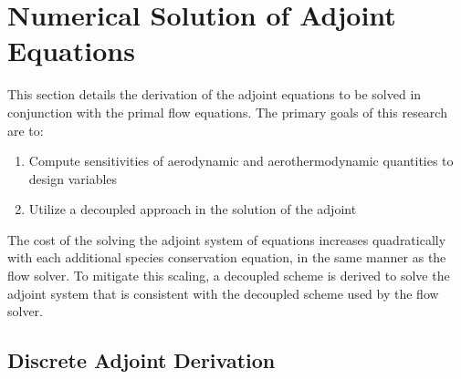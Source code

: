 \chapter{Numerical Solution of Adjoint Equations}
\label{chapter-four}

This section details the derivation of the adjoint equations to be solved in
conjunction with the primal flow equations.  The primary goals of this research
are to:
\begin{enumerate}
  \item Compute sensitivities of aerodynamic and aerothermodynamic quantities to
    design variables
  \item Utilize a decoupled approach in the solution of the adjoint
\end{enumerate}
The cost of the solving the adjoint system of equations increases quadratically
with each additional species conservation equation, in the same manner as the
flow solver.  To mitigate this scaling, a decoupled scheme is derived to solve
the adjoint system that is consistent with the decoupled scheme used by the flow
solver.

\section{Discrete Adjoint Derivation}
\label{sec:adj-derivation}

